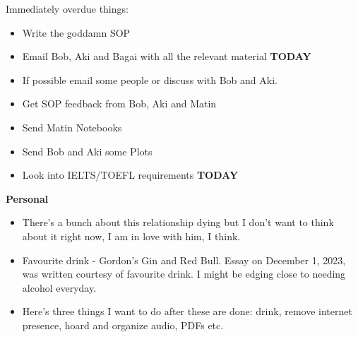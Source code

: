 \noindent {}
Immediately overdue things:
\begin{itemize}
    \item Write the goddamn SOP
    \item Email Bob, Aki and Bagai with all the relevant material \textbf{TODAY}
    \item If possible email some people or discuss with Bob and Aki. 
    \item Get SOP feedback from Bob, Aki and Matin
    \item Send Matin Notebooks
    \item Send Bob and Aki some Plots
    \item Look into IELTS/TOEFL requirements \textbf{TODAY}
\end{itemize}

\noindent \textbf{Personal}\\
\begin{itemize}
    \item There's a bunch about this relationship dying but I don't want to think about it right now, I am in love with him, I think.
    \item Favourite drink - Gordon's Gin and Red Bull. Essay on December 1, 2023, was written courtesy of favourite drink. I might be edging close to needing alcohol everyday.
    \item  Here's three things I want to do after these are done: drink, remove internet presence, hoard and organize audio, PDFs etc.
\end{itemize}